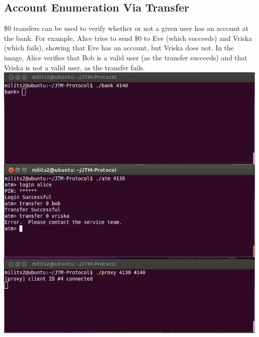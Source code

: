\documentclass{article}
\begin{document}
\subsection{Account Enumeration Via Transfer}
\$0 transfers can be used to verify whether or not a given user has an account at the bank. For example, Alice tries to send \$0 to Eve (which succeeds) and Vriska (which fails), showing that Eve has an account, but Vriska does not. In the image, Alice verifies that Bob is a valid user (as the transfer succeeds) and that Vriska is not a valid user, as the transfer fails.
\\
\includegraphics[scale=0.5]{transferUser.png}
\\
\end{document}
